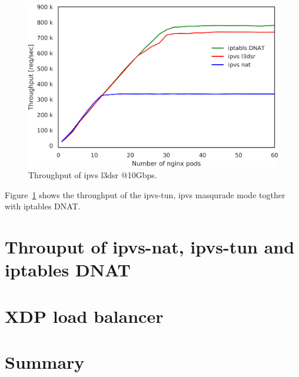 \begin{figure}[t]
  \centering
  \includegraphics[width=0.8\columnwidth]{Figs/ipvs_l3dsr_10g.png}
  \caption{Throughput of ipvs l3dsr @10Gbps.}
  \label{fig:ipvs_l3dsr_10g.png}
\end{figure}

Figure~\ref{fig:ipvs_l3dsr_10g.png} shows the throughput of the ipvs-tun, ipvs masqurade mode togther with iptables DNAT.

\FloatBarrier
\section{Throuput of ipvs-nat, ipvs-tun and iptables DNAT}

\FloatBarrier
\section{XDP load balancer}

\section{Summary}



